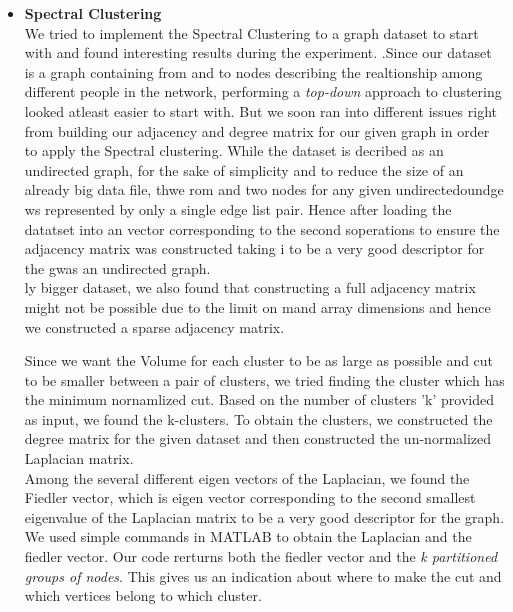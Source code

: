 \documentclass[11pt]{exam}
\begin{document}
\begin{itemize}
\begin{itemize}
\item\textbf{Spectral Clustering}\\

We tried to implement the Spectral Clustering to a  graph dataset to start with and found interesting results during the experiment.
.Since our dataset is a graph containing from and to nodes describing the realtionship among different people in the network, performing a \emph{top-down} approach to clustering looked atleast easier to start with. But we soon ran into different issues right from building our adjacency and degree matrix for our given graph in order to apply the Spectral clustering. While the dataset is decribed as an undirected graph, for the sake of simplicity and to reduce the size of an already big data file, thwe rom and two nodes for any given undirectedoundge ws represented by only a single edge list pair. Hence after loading the datatset into an vector corresponding to the second soperations to ensure the adjacency matrix was constructed taking i to be a very good descriptor for the gwas an undirected graph. \\                                                                                                                                  ly bigger dataset, we also found that constructing a full adjacency matrix might not be possible due to the limit on m\emory and array dimensions and hence we constructed a sparse adjacency matrix. 

Since we want the Volume for each cluster to be as large as possible and cut to be smaller between a pair of clusters, we tried finding the cluster which has the minimum nornamlized cut. Based on the number of clusters 'k' provided as input, we found the k-clusters. To obtain the clusters, we constructed the degree matrix for the given dataset and then constructed the un-normalized Laplacian matrix. \\

Among the several different eigen vectors of the Laplacian, we found the Fiedler vector, which is eigen vector corresponding to the second smallest eigenvalue of the Laplacian matrix to be a very good descriptor for the graph. We used simple commands in MATLAB to obtain the Laplacian and the fiedler vector. Our code rerturns both the fiedler vector and the \emph{ k partitioned groups of nodes}. This gives us an indication about where to make the cut and which vertices belong to which cluster.



\end{itemize}

\end{itemize}
\end{document}
